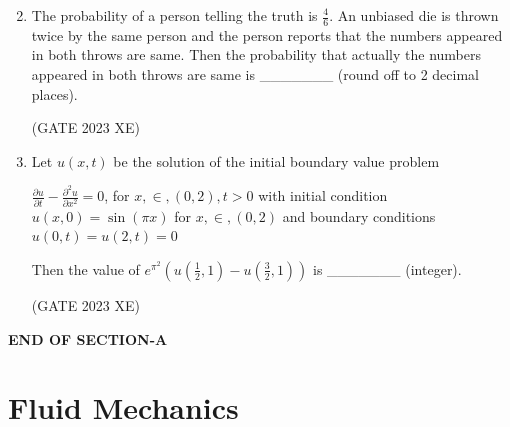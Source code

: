 \documentclass[journal,12pt,onecolumn]{IEEEtran}
\begin{document}
\begin{enumerate}
\begin{multicols}{2}
\end{multicols}

\item The probability of a person telling the truth is $\frac{4}{6}$. An unbiased die is thrown twice by
the same person and the person reports that the numbers appeared in both
throws are same. Then the probability that actually the numbers appeared in
both throws are same is \_\_\_\_\_\_\_ (round off to 2 decimal places).

\hfill{(GATE 2023 XE)}

\item Let $u(x,t)$ be the solution of the initial boundary value problem

$\frac{\partial u}{\partial t} - \frac{\partial^2 u}{\partial x^2} = 0$, for $x , \in , (0,2), t > 0$ with initial condition $u(x,0) = \sin (\pi x)$ for $x , \in , (0,2)$ and boundary conditions $u(0,t) = u(2,t) = 0$

Then the value of $e^{\pi^2} (u(\frac{1}{2},1) - u(\frac{3}{2},1))$ is \_\_\_\_\_\_\_ (integer).

\hfill{(GATE 2023 XE)}

\end{enumerate}

\begin{center}

\item[\textbf{END OF SECTION-A}]

\end{center}


\newpage

\section*{Fluid Mechanics}
\bigskip
\end{document}
